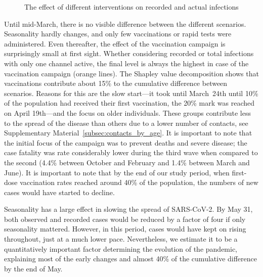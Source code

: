 \begin{figure}[!tp]
    \caption{The effect of different interventions on recorded and actual infections}
    \label{fig:2021_scenarios_broad}

\end{figure}

Until mid-March, there is no visible difference between the different scenarios.
Seasonality hardly changes, and only few vaccinations or rapid tests were administered.
Even thereafter, the effect of the vaccination campaign is surprisingly small at first
sight. Whether considering recorded or total infections with only one channel active,
the final level is always the highest in case of the vaccination campaign (orange
lines). The Shapley value decomposition shows that vaccinations contribute about 15\% to
the cumulative difference between scenarios. Reasons for this are the slow start---it
took until March~24th until 10\% of the population had received their first vaccination,
the 20\% mark was reached on April 19th---and the focus on older individuals. These
groups contribute less to the spread of the disease than others due to a lower number of
contacts, see Supplementary Material~\ref{subsec:contacts_by_age}. It is important to
note that the initial focus of the campaign was to prevent deaths and severe disease;
the case fatality was rate considerably lower during the third wave when compared to the
second (4.4\% between October and February and 1.4\% between March and June). It is
important to note that by the end of our study period, when first-dose vaccination rates
reached around 40\% of the population, the numbers of new cases would have started to
decline.

Seasonality has a large effect in slowing the spread of SARS-CoV-2. By May 31, both
observed and recorded cases would be reduced by a factor of four if only seasonality
mattered. However, in this period, cases would have kept on rising throughout, just at a
much lower pace. Nevertheless, we estimate it to be a quantitatively important factor
determining the evolution of the pandemic, explaining most of the early changes and
almost 40\% of the cumulative difference by the end of May.

